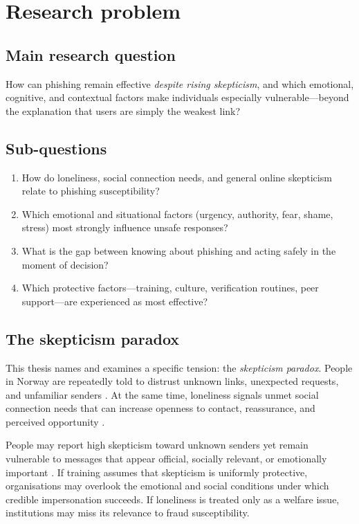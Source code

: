 \documentclass[UKenglish,12pt]{master-style}
\begin{document}
\section{Research problem}

\subsection{Main research question}

How can phishing remain effective \emph{despite rising skepticism}, and which emotional, cognitive, and contextual factors make individuals especially vulnerable---beyond the explanation that users are simply the weakest link?

\subsection{Sub-questions}

\begin{enumerate}
    \item How do loneliness, social connection needs, and general online skepticism relate to phishing susceptibility?
    \item Which emotional and situational factors (urgency, authority, fear, shame, stress) most strongly influence unsafe responses?
    \item What is the gap between knowing about phishing and acting safely in the moment of decision?
    \item Which protective factors---training, culture, verification routines, peer support---are experienced as most effective?
\end{enumerate}

\subsection{The skepticism paradox}
\label{sec:skepticism-paradox}

This thesis names and examines a specific tension: the \emph{skepticism paradox}. People in Norway are repeatedly told to distrust unknown links, unexpected requests, and unfamiliar senders \parencite{finansnorge2026svindel,nettvettPhishing}. At the same time, loneliness signals unmet social connection needs that can increase openness to contact, reassurance, and perceived opportunity \parencite{cacioppo2008loneliness,nicholson2021loneliness}.

People may report high skepticism toward unknown senders yet remain vulnerable to messages that appear official, socially relevant, or emotionally important \parencite{kluetsch2024friend,parker2020contributing}. If training assumes that skepticism is uniformly protective, organisations may overlook the emotional and social conditions under which credible impersonation succeeds. If loneliness is treated only as a welfare issue, institutions may miss its relevance to fraud susceptibility.
\end{document}
